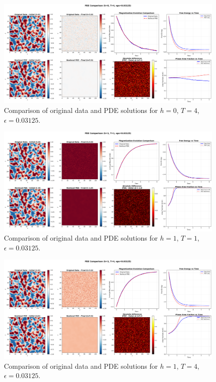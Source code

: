 \documentclass[11pt,a4paper]{article}
\begin{document}
\begin{figure}[h]
    \centering
    \includegraphics[width=1.0\textwidth]{fig/pde_comparison_h0_T4_eps0.03125.png}
    \caption{Comparison of original data and PDE solutions for $h=0$, $T=4$, $\epsilon=0.03125$.}
\end{figure}


\begin{figure}[!h]
    \centering
    \includegraphics[width=1.0\textwidth]{fig/pde_comparison_h1_T1_eps0.03125.png}
    \caption{Comparison of original data and PDE solutions for $h=1$, $T=1$, $\epsilon=0.03125$.}
\end{figure}


\begin{figure}[h]
    \centering
    \includegraphics[width=1.0\textwidth]{fig/pde_comparison_h1_T4_eps0.03125.png}
    \caption{Comparison of original data and PDE solutions for $h=1$, $T=4$, $\epsilon=0.03125$.}
\end{figure}
\end{document}
